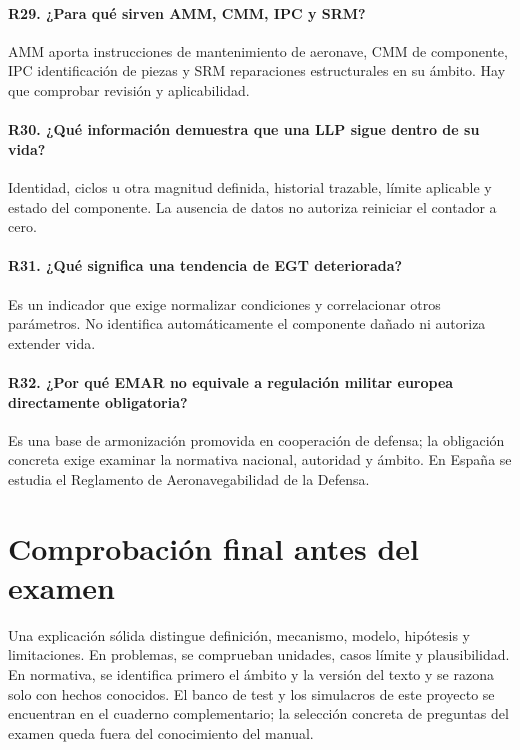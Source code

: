 \paragraph{R29. ¿Para qué sirven AMM, CMM, IPC y SRM?} AMM aporta instrucciones de mantenimiento de aeronave, CMM de componente, IPC identificación de piezas y SRM reparaciones estructurales en su ámbito. Hay que comprobar revisión y aplicabilidad.

\paragraph{R30. ¿Qué información demuestra que una LLP sigue dentro de su vida?} Identidad, ciclos u otra magnitud definida, historial trazable, límite aplicable y estado del componente. La ausencia de datos no autoriza reiniciar el contador a cero.

\paragraph{R31. ¿Qué significa una tendencia de EGT deteriorada?} Es un indicador que exige normalizar condiciones y correlacionar otros parámetros. No identifica automáticamente el componente dañado ni autoriza extender vida.

\paragraph{R32. ¿Por qué EMAR no equivale a regulación militar europea directamente obligatoria?} Es una base de armonización promovida en cooperación de defensa; la obligación concreta exige examinar la normativa nacional, autoridad y ámbito. En España se estudia el Reglamento de Aeronavegabilidad de la Defensa.

\section{Comprobación final antes del examen}
Una explicación sólida distingue definición, mecanismo, modelo, hipótesis y limitaciones. En problemas, se comprueban unidades, casos límite y plausibilidad. En normativa, se identifica primero el ámbito y la versión del texto y se razona solo con hechos conocidos. El banco de test y los simulacros de este proyecto se encuentran en el cuaderno complementario; la selección concreta de preguntas del examen queda fuera del conocimiento del manual.
